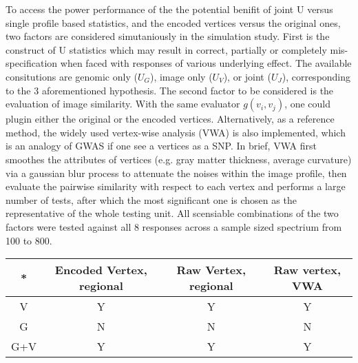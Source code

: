 To access the power performance of the the potential benifit of joint U versus single profile based statistics, and the encoded vertices versus the original ones, two factors are considered simutaniously in the simulation study. First is the construct of U statistics which may result in correct, partially or completely mis-specification when faced with responses of various underlying effect. The available consitutions are genomic only ($U_G$), image only ($U_V$), or joint ($U_J$), corresponding to the 3 aforementioned hypothesis. The second factor to be considered is the evaluation of image similarity. With the same evaluator $g(v_i, v_j)$, one could plugin either the original or the encoded vertices. Alternatively, as a reference method, the widely used vertex-wise analysis (VWA) is also implemented, which is an analogy of GWAS if one see a vertices as a SNP. In brief, VWA first smoothes the attributes of vertices (e.g. gray matter thickness, average curvature) via a gaussian blur process to attenuate the noises within the image profile, then evaluate the pairwise similarity with respect to each vertex and performs a large number of tests, after which the most significant one is chosen as the representative of the whole testing unit. All scensiable combinations of the two factors were tested against all 8 responses across a sample sized spectrium from 100 to 800.

\begin{tabular}{|c|c|c|c|}
  \hline
  *   & Encoded Vertex, regional & Raw Vertex, regional & Raw vertex, VWA  \\ \hline
  V   & Y              & Y          & Y            \\ \hline
  G   & N              & N          & N            \\ \hline
  G+V & Y              & Y          & Y            \\ \hline
\end{tabular}

